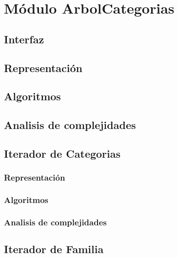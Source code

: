 \documentclass[12pt, a4paper]{article}
\begin{document}
\maketitle
\tableofcontents
\newpage

\section{Módulo ArbolCategorias} 
\subsection{Interfaz}

\subsection{Representaci\'on}

\subsection{Algoritmos}

\subsection{Analisis de complejidades}


\subsection{Iterador de Categorias} 
%
\subsubsection{Representaci\'on}

\subsubsection{Algoritmos}

\subsubsection{Analisis de complejidades}


\subsection{Iterador de Familia} 
%
\end{document}
